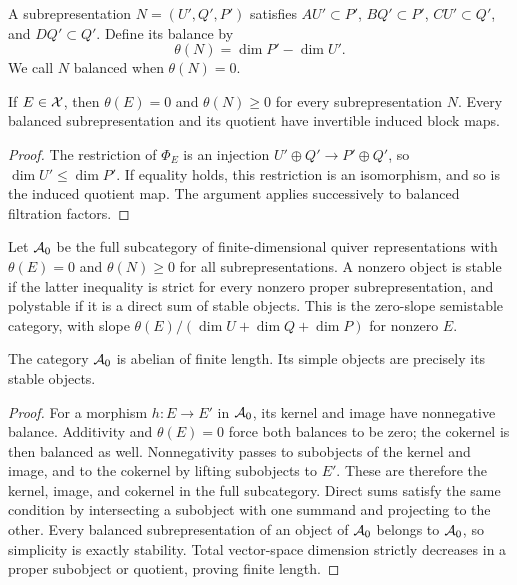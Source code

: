 A subrepresentation $N=(U',Q',P')$ satisfies
$AU'\subset P'$, $BQ'\subset P'$, $CU'\subset Q'$, and $DQ'\subset Q'$.
Define its balance by
\begin{equation}\label{m1:eq:theta}
 \theta(N)=\dim P'-\dim U'.
\end{equation}
We call $N$ balanced when $\theta(N)=0$.

\begin{lemma}\label{m1:lem:theta-nonnegative}
If $E\in\mathcal X$, then $\theta(E)=0$ and $\theta(N)\geq0$ for every
subrepresentation $N$. Every balanced subrepresentation and its quotient
have invertible induced block maps.
\end{lemma}
\begin{proof}
The restriction of $\Phi_E$ is an injection
$U'\oplus Q'\to P'\oplus Q'$, so $\dim U'\leq\dim P'$. If equality
holds, this restriction is an isomorphism, and so is the induced quotient
map. The argument applies successively to balanced filtration factors.
\end{proof}

Let $\mathcal A_0$ be the full subcategory of finite-dimensional quiver
representations with $\theta(E)=0$ and $\theta(N)\geq0$ for all
subrepresentations. A nonzero object is stable if the latter inequality
is strict for every nonzero proper subrepresentation, and polystable if
it is a direct sum of stable objects. This is the zero-slope semistable
category, with slope $\theta(E)/(\dim U+\dim Q+\dim P)$ for nonzero $E$.

\begin{lemma}\label{m1:lem:A0-abelian}
The category $\mathcal A_0$ is abelian of finite length. Its simple objects
are precisely its stable objects.
\end{lemma}
\begin{proof}
For a morphism $h:E\to E'$ in $\mathcal A_0$, its kernel and image have
nonnegative balance. Additivity and $\theta(E)=0$ force both balances
to be zero; the cokernel is then balanced as well. Nonnegativity passes
to subobjects of the kernel and image, and to the cokernel by lifting
subobjects to $E'$. These are therefore the kernel, image, and cokernel
in the full subcategory. Direct sums satisfy the same condition by
intersecting a subobject with one summand and projecting to the other.
Every balanced subrepresentation of an object of $\mathcal A_0$ belongs to
$\mathcal A_0$, so simplicity is exactly stability. Total vector-space
dimension strictly decreases in a proper subobject or quotient, proving
finite length.
\end{proof}

